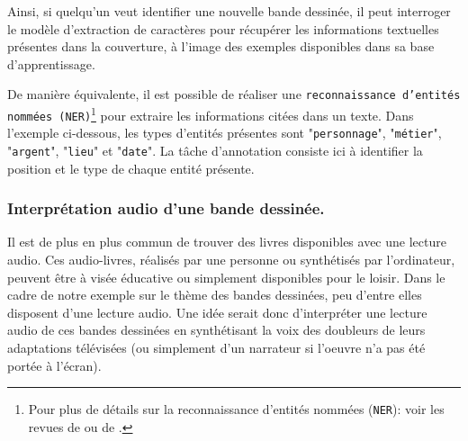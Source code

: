 			Ainsi, si quelqu'un veut identifier une nouvelle bande dessinée, il peut interroger le modèle d'extraction de caractères pour récupérer les informations textuelles présentes dans la couverture, à l'image des exemples disponibles dans sa base d'apprentissage.
			
			\begin{leftBarInformation}
				De manière équivalente, il est possible de réaliser une \texttt{reconnaissance d'entités nommées (\texttt{NER})}\footnote{
					Pour plus de détails sur la reconnaissance d'entités nommées (\texttt{NER}): voir les revues de \cite{goyal-etal:2018:recent-named-entity} ou de \cite{li-etal:2022:survey-deep-learning}.
				} pour extraire les informations citées dans un texte.
				Dans l'exemple ci-dessous, les types d'entités présentes sont "\texttt{personnage}", "\texttt{métier}", "\texttt{argent}", "\texttt{lieu}" et "\texttt{date}".
				La tâche d'annotation consiste ici à identifier la position et le type de chaque entité présente.
				
				\begin{quote}
				\end{quote}
			\end{leftBarInformation}
		
		
		\subsubsection{Interprétation audio d'une bande dessinée.}
		\label{section:2.1.2.D-PRESENTATION-ANNOTATION-EXEMPLES-TRANSCRIPTION}
		
			Il est de plus en plus commun de trouver des livres disponibles avec une lecture audio.
			Ces audio-livres, réalisés par une personne ou synthétisés par l'ordinateur, peuvent être à visée éducative ou simplement disponibles pour le loisir.
			Dans le cadre de notre exemple sur le thème des bandes dessinées, peu d'entre elles disposent d'une lecture audio.
			Une idée serait donc d'interpréter une lecture audio de ces bandes dessinées en synthétisant la voix des doubleurs de leurs adaptations télévisées (ou simplement d'un narrateur si l'oeuvre n'a pas été portée à l'écran).
			
